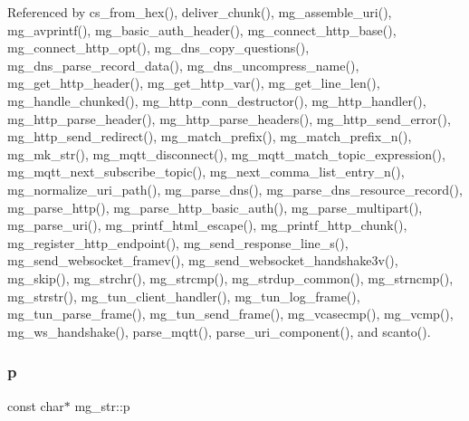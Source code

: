 Referenced by cs\+\_\+from\+\_\+hex(), deliver\+\_\+chunk(), mg\+\_\+assemble\+\_\+uri(), mg\+\_\+avprintf(), mg\+\_\+basic\+\_\+auth\+\_\+header(), mg\+\_\+connect\+\_\+http\+\_\+base(), mg\+\_\+connect\+\_\+http\+\_\+opt(), mg\+\_\+dns\+\_\+copy\+\_\+questions(), mg\+\_\+dns\+\_\+parse\+\_\+record\+\_\+data(), mg\+\_\+dns\+\_\+uncompress\+\_\+name(), mg\+\_\+get\+\_\+http\+\_\+header(), mg\+\_\+get\+\_\+http\+\_\+var(), mg\+\_\+get\+\_\+line\+\_\+len(), mg\+\_\+handle\+\_\+chunked(), mg\+\_\+http\+\_\+conn\+\_\+destructor(), mg\+\_\+http\+\_\+handler(), mg\+\_\+http\+\_\+parse\+\_\+header(), mg\+\_\+http\+\_\+parse\+\_\+headers(), mg\+\_\+http\+\_\+send\+\_\+error(), mg\+\_\+http\+\_\+send\+\_\+redirect(), mg\+\_\+match\+\_\+prefix(), mg\+\_\+match\+\_\+prefix\+\_\+n(), mg\+\_\+mk\+\_\+str(), mg\+\_\+mqtt\+\_\+disconnect(), mg\+\_\+mqtt\+\_\+match\+\_\+topic\+\_\+expression(), mg\+\_\+mqtt\+\_\+next\+\_\+subscribe\+\_\+topic(), mg\+\_\+next\+\_\+comma\+\_\+list\+\_\+entry\+\_\+n(), mg\+\_\+normalize\+\_\+uri\+\_\+path(), mg\+\_\+parse\+\_\+dns(), mg\+\_\+parse\+\_\+dns\+\_\+resource\+\_\+record(), mg\+\_\+parse\+\_\+http(), mg\+\_\+parse\+\_\+http\+\_\+basic\+\_\+auth(), mg\+\_\+parse\+\_\+multipart(), mg\+\_\+parse\+\_\+uri(), mg\+\_\+printf\+\_\+html\+\_\+escape(), mg\+\_\+printf\+\_\+http\+\_\+chunk(), mg\+\_\+register\+\_\+http\+\_\+endpoint(), mg\+\_\+send\+\_\+response\+\_\+line\+\_\+s(), mg\+\_\+send\+\_\+websocket\+\_\+framev(), mg\+\_\+send\+\_\+websocket\+\_\+handshake3v(), mg\+\_\+skip(), mg\+\_\+strchr(), mg\+\_\+strcmp(), mg\+\_\+strdup\+\_\+common(), mg\+\_\+strncmp(), mg\+\_\+strstr(), mg\+\_\+tun\+\_\+client\+\_\+handler(), mg\+\_\+tun\+\_\+log\+\_\+frame(), mg\+\_\+tun\+\_\+parse\+\_\+frame(), mg\+\_\+tun\+\_\+send\+\_\+frame(), mg\+\_\+vcasecmp(), mg\+\_\+vcmp(), mg\+\_\+ws\+\_\+handshake(), parse\+\_\+mqtt(), parse\+\_\+uri\+\_\+component(), and scanto().

\mbox{\label{structmg__str_a1e743a766f92c904d25fe4d058017486_a1e743a766f92c904d25fe4d058017486}} 
\subsubsection{\texorpdfstring{p}{p}}
{\footnotesize\ttfamily const char$\ast$ mg\+\_\+str\+::p}



